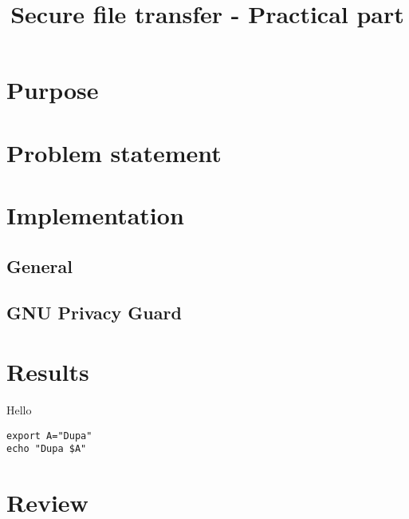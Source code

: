 \documentclass{classrep}
\author{
  \studentinfo{Michał Sośnicki}{207597} \and
  \studentinfo{Daniel Pęczek}{207585}
}
\title{Secure file transfer - Practical part}
\begin{document}
\maketitle

\section{Purpose}

\section{Problem statement}

\section{Implementation}

\subsection{General}

\subsection{GNU Privacy Guard}

\section{Results}

Hello
\begin{lstlisting}[label={lst:consistent_conflicting_code}, caption={Fragment}]
export A="Dupa"
echo "Dupa $A"
\end{lstlisting}

\section{Review}
\end{document}
